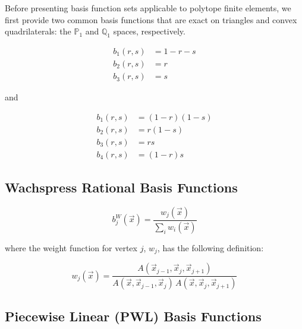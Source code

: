 Before presenting basis function sets applicable to polytope finite elements, we first provide two common basis functions that are exact on triangles and convex quadrilaterals: the $\mathbb{P}_{1}$ and $\mathbb{Q}_{1}$ spaces, respectively. 

\begin{equation}
\label{eq::2D_lin_basis_functions}
\begin{aligned}
	b_1(r,s) & = 1-r-s \\
	b_2(r,s) & = r \\
	b_3(r,s) & = s 
\end{aligned}
\end{equation}

\noindent 

and

\begin{equation}
\label{eq::BiL_basis_functions}
\begin{aligned}
	b_1(r,s) & = (1-r)(1-s) \\
	b_2(r,s) & = r(1-s) \\
	b_3(r,s) & = rs \\
	b_4(r,s) & = (1-r)s
\end{aligned}
\end{equation}


\subsection{Wachspress Rational Basis Functions}
\label{sec::BF_2DLinear_Wachspress}

\begin{equation}
\label{eq::BF_wach_BF}
b_{j}^{W} (\vec{x}) = \frac{w_j (\vec{x}) }{\sum_i w_i (\vec{x})}
\end{equation}

\noindent where the weight function for vertex $j$, $w_j$, has the following definition:

\begin{equation}
\label{eq::BF_wach_weights}
w_j (\vec{x})  = \frac{A(\vec{x}_{j-1}, \vec{x}_{j}, \vec{x}_{j+1})}{A(\vec{x}, \vec{x}_{j-1}, \vec{x}_{j}) \, A(\vec{x}, \vec{x}_{j}, \vec{x}_{j+1})}
\end{equation}

\subsection{Piecewise Linear (PWL) Basis Functions}
\label{sec::BF_2DLinear_PWL}

